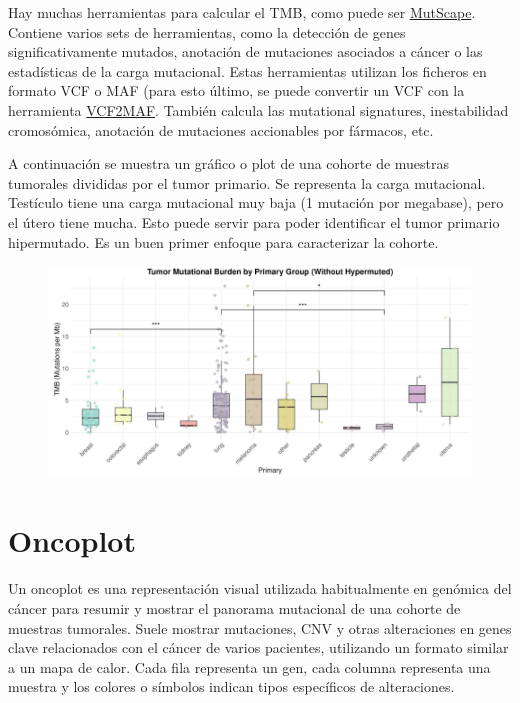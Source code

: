 Hay muchas herramientas para calcular el TMB, como puede ser \href{https://github.com/anitalu724/MutScape}{MutScape}. Contiene varios sets de herramientas, como la detección de genes significativamente mutados, anotación de mutaciones asociados a cáncer o las estadísticas de la carga mutacional. Estas herramientas utilizan los ficheros en formato VCF o MAF (para esto último, se puede convertir un VCF con la herramienta \href{https://github.com/mskcc/vcf2maf}{VCF2MAF}. También calcula las mutational signatures, inestabilidad cromosómica, anotación de mutaciones accionables por fármacos, etc. 

A continuación se muestra un gráfico o plot de una cohorte de muestras tumorales divididas por el tumor primario. Se representa la carga mutacional. Testículo tiene una carga mutacional muy baja (1 mutación por megabase), pero el útero tiene mucha. Esto puede servir para poder identificar el tumor primario hipermutado. Es un buen primer enfoque para caracterizar la cohorte.

\begin{figure}[htbp]
\centering
\includegraphics[width = \textwidth]{figs/tmb.png}
\end{figure}

\section{Oncoplot}
Un oncoplot es una representación visual utilizada habitualmente en genómica del cáncer para resumir y mostrar el panorama mutacional de una cohorte de muestras tumorales. Suele mostrar mutaciones, CNV y otras alteraciones en genes clave relacionados con el cáncer de varios pacientes, utilizando un formato similar a un mapa de calor. Cada fila representa un gen, cada columna representa una muestra y los colores o símbolos indican tipos específicos de alteraciones.

